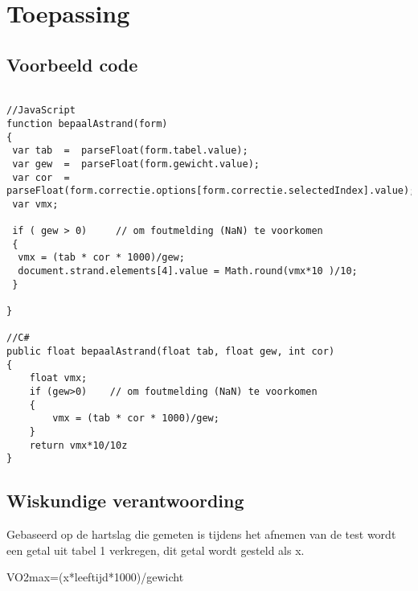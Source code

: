 \documentclass[]{article}
\begin{document}
\section{Toepassing}
\subsection{Voorbeeld code}
\begin{verbatim}

//JavaScript
function bepaalAstrand(form)
{
 var tab  =  parseFloat(form.tabel.value);
 var gew  =  parseFloat(form.gewicht.value);
 var cor  =  parseFloat(form.correctie.options[form.correctie.selectedIndex].value);
 var vmx;

 if ( gew > 0)     // om foutmelding (NaN) te voorkomen
 {
  vmx = (tab * cor * 1000)/gew;
  document.strand.elements[4].value = Math.round(vmx*10 )/10;
 }

}

//C#
public float bepaalAstrand(float tab, float gew, int cor)
{
    float vmx;
    if (gew>0)    // om foutmelding (NaN) te voorkomen
    {
        vmx = (tab * cor * 1000)/gew;
    }
    return vmx*10/10z
}

\end{verbatim}
\subsection{Wiskundige verantwoording}
Gebaseerd op de hartslag die gemeten is tijdens het afnemen van de test wordt een getal uit tabel 1 verkregen, dit getal wordt gesteld als x.
 
VO2max=(x*leeftijd*1000)/gewicht
\end{document}

